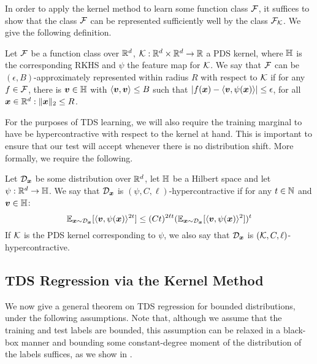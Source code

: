 \documentclass[11pt]{article} %
\numberwithin{equation}{section}
\begin{document}
In order to apply the kernel method to learn some function class ${\mathcal{F}}$, it suffices to show that the class ${\mathcal{F}}$ can be represented sufficiently well by the class ${\mathcal{F}}_{\mathcal{K}}$. We give the following definition.
\begin{definition}\label{definition:approx-representation}
    Let ${\mathcal{F}}$ be a function class over $\mathbb{R}^d$, $\mathcal{K}:\mathbb{R}^d \times \mathbb{R}^d \to \mathbb{R}$ a PDS kernel, where ${\mathbb{H}}$ is the corresponding RKHS and $\psi$ the feature map for $\mathcal{K}$. We say that ${\mathcal{F}}$ can be $(\epsilon, B)$-approximately represented within radius $R$ with respect to $\mathcal{K}$ if for any $f\in {\mathcal{F}}$, there is ${\bm{v}}\in {\mathbb{H}}$ with $\langle {\bm{v}}, {\bm{v}}\rangle \le B$ such that $|f({\bm{x}}) - \langle {\bm{v}}, \psi({\bm{x}})\rangle| \le \epsilon$, for all ${\bm{x}}\in \mathbb{R}^d:\|{\bm{x}}\|_2 \le R$.
\end{definition}
For the purposes of TDS learning, we will also require the training marginal to have be hypercontractive with respect to the kernel at hand. This is important to ensure that our test will accept whenever there is no distribution shift. More formally, we require the following.
\begin{definition}[Hypercontractivity]\label{definition:hypercontractivity}
    Let ${\mathcal{D}}_{{\bm{x}}}$ be some distribution over $\mathbb{R}^d$, let ${\mathbb{H}}$ be a Hilbert space and let $\psi:\mathbb{R}^d\to {\mathbb{H}}$.
    We say that ${\mathcal{D}}_{{\bm{x}}}$ is $(\psi,C,\ell)$-hypercontractive if for any $t\in{\mathbb{N}}$ and ${\bm{v}}\in{\mathbb{H}}$:
    \[
        \mathbb{E}_{{\bm{x}}\sim{\mathcal{D}}_{{\bm{x}}}}[\langle {\bm{v}}, \psi({\bm{x}})\rangle^{2t}] \le (Ct)^{2\ell t} (\mathbb{E}_{{\bm{x}}\sim{\mathcal{D}}_{{\bm{x}}}}[\langle {\bm{v}}, \psi({\bm{x}})\rangle^2])^t
    \]
    If $\mathcal{K}$ is the PDS kernel corresponding to $\psi$, we also say that ${\mathcal{D}}_{{\bm{x}}}$ is $(\mathcal{K},C,\ell)$-hypercontractive. 
\end{definition}

\subsection{TDS Regression via the Kernel Method}\label{section:tds-kernel}

We now give a general theorem on TDS regression for bounded distributions, under the following assumptions. Note that, although we assume that the training and test labels are bounded, this assumption can be relaxed in a black-box manner and bounding some constant-degree moment of the distribution of the labels suffices, as we show in .
\end{document}
